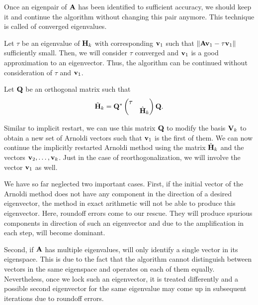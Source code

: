 \begin{remark}
  Once an eigenpair of $\mathbf A$ has been identified to sufficient
  accuracy, we should keep it and continue the algorithm without
  changing this pair anymore. This technique is called
   of converged eigenvalues.

  Let $\tau$ be an eigenvalue of $\mathbf H_k$ with corresponding
   $\mathbf v_1$ such that
  $\lVert\mathbf A\mathbf v_1 - \tau\mathbf v_1\rVert$ sufficiently small. Then, we will
  consider $\tau$ converged and $\mathbf v_1$ is a good approximation to an
  eigenvector. Thus, the algorithm can be continued without
  consideration of $\tau$ and $\mathbf v_1$.

  Let $\mathbf Q$ be an orthogonal matrix such that
  \begin{gather}
    \tilde {\mathbf H}_k = \mathbf Q^*
    \begin{pmatrix}
      \tau \\&\hat {\mathbf H}_k
    \end{pmatrix} \mathbf Q.
  \end{gather}

  Similar to implicit restart, we can use this matrix $\mathbf Q$ to
  modify the basis $\mathbf V_k$ to obtain a new set of Arnoldi vectors
  such that $\mathbf v_1$ is the first of them. We can now continue the
  implicitly restarted Arnoldi method using the matrix $\hat{\mathbf H}_k$
  and the vectors $\mathbf v_2,\dots,\mathbf v_k$. Just in the case of
  reorthogonalization, we will involve the vector $\mathbf v_1$ as well.
\end{remark}

\begin{remark}
  We have so far neglected two important cases. First, if the initial
  vector of the Arnoldi method does not have any component in the
  direction of a desired eigenvector, the method in exact arithmetic
  will not be able to produce this eigenvector. Here, roundoff errors
  come to our rescue. They will produce spurious components in
  direction of such an eigenvector and due to the amplification in
  each step, will become dominant.
  
  Second, if $\mathbf A$ has multiple eigenvalues,
   will only identify a single vector in its
  eigenspace. This is due to the fact that the algorithm cannot
  distinguish between vectors in the same eigenspace and operates on
  each of them equally. Nevertheless, once we lock such an
  eigenvector, it is treated differently and a possible second
  eigenvector for the same eigenvalue may come up in subsequent
  iterations due to roundoff errors.
\end{remark}


